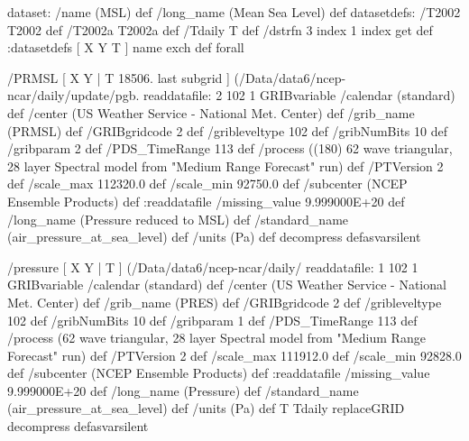 \begin{ingrid}



 dataset: /name (MSL) def /long_name (Mean Sea Level) def
datasetdefs:
  /T2002 T2002 def
  /T2002a T2002a def
/Tdaily T def
/dstrfn 3 index 1 index get def
:datasetdefs
  [ X Y T ] { name exch def } forall


  /PRMSL { [ X Y | T 18506. last subgrid ] (/Data/data6/ncep-ncar/daily/update/pgb.%
  readdatafile:
  2 102 1 GRIBvariable
  /calendar (standard) def
  /center (US Weather Service - National Met. Center) def
  /grib_name (PRMSL) def
  /GRIBgridcode 2 def
  /gribleveltype 102 def
  /gribNumBits 10 def
  /gribparam 2 def
  /PDS_TimeRange 113 def
  /process ((180) 62 wave triangular, 28 layer Spectral model from "Medium Range Forecast" run) def
  /PTVersion 2 def
  /scale_max 112320.0 def
  /scale_min 92750.0 def
  /subcenter (NCEP Ensemble Products) def
  :readdatafile
  /missing_value 9.999000E+20 def
  /long_name (Pressure reduced to MSL) def
  /standard_name (air_pressure_at_sea_level) def
  /units (Pa) def
  decompress
  } defasvarsilent

  /pressure { [ X Y | T ] (/Data/data6/ncep-ncar/daily/%
  readdatafile:
  1 102 1 GRIBvariable
  /calendar (standard) def
  /center (US Weather Service - National Met. Center) def
  /grib_name (PRES) def
  /GRIBgridcode 2 def
  /gribleveltype 102 def
  /gribNumBits 10 def
  /gribparam 1 def
  /PDS_TimeRange 113 def
  /process (62 wave triangular, 28 layer Spectral model from "Medium Range Forecast" run) def
  /PTVersion 2 def
  /scale_max 111912.0 def
  /scale_min 92828.0 def
  /subcenter (NCEP Ensemble Products) def
  :readdatafile
  /missing_value 9.999000E+20 def
  /long_name (Pressure) def
  /standard_name (air_pressure_at_sea_level) def
  /units (Pa) def
T Tdaily replaceGRID
  decompress 
 } defasvarsilent




\end{ingrid}
